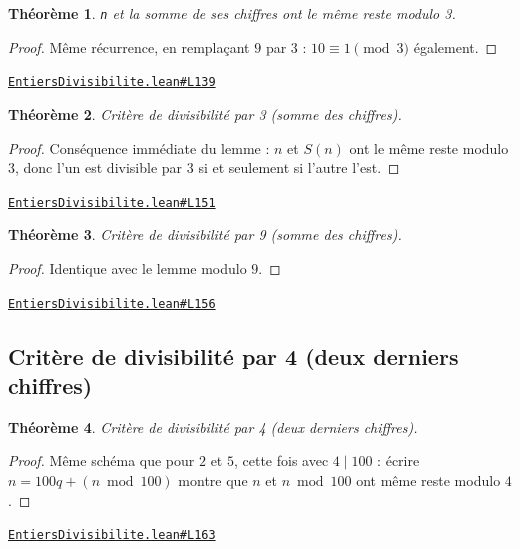 \documentclass[11pt,a4paper]{article}
\theoremstyle{definition}
\theoremstyle{plain}
\newtheorem{theoreme}{Théorème}
\newcommand{\source}[2]{\par\smallskip\noindent\hfill{\footnotesize\href{#1}{\texttt{#2}}}\par\smallskip}
\begin{document}
\begin{theoreme}
\texttt{n} et la somme de ses chiffres ont le même reste modulo 3.
\end{theoreme}

\begin{proof}
Même récurrence, en remplaçant $9$ par $3$ : $10 \equiv 1 \pmod 3$ également.
\end{proof}
\source{https://github.com/Commutator-IO/learn-lean/blob/main/courses/01-college/01-nombres-et-calculs/EntiersDivisibilite.lean\#L139}{EntiersDivisibilite.lean\#L139}

\begin{theoreme}
Critère de divisibilité par 3 (somme des chiffres).
\end{theoreme}

\begin{proof}
Conséquence immédiate du lemme : $n$ et $S(n)$ ont le même reste modulo $3$, donc l'un
est divisible par $3$ si et seulement si l'autre l'est.
\end{proof}
\source{https://github.com/Commutator-IO/learn-lean/blob/main/courses/01-college/01-nombres-et-calculs/EntiersDivisibilite.lean\#L151}{EntiersDivisibilite.lean\#L151}

\begin{theoreme}
Critère de divisibilité par 9 (somme des chiffres).
\end{theoreme}

\begin{proof}
Identique avec le lemme modulo $9$.
\end{proof}
\source{https://github.com/Commutator-IO/learn-lean/blob/main/courses/01-college/01-nombres-et-calculs/EntiersDivisibilite.lean\#L156}{EntiersDivisibilite.lean\#L156}

\subsection{Critère de divisibilité par 4 (deux derniers chiffres)}

\begin{theoreme}
Critère de divisibilité par 4 (deux derniers chiffres).
\end{theoreme}

\begin{proof}
Même schéma que pour $2$ et $5$, cette fois avec $4 \mid 100$ : écrire
$n = 100q + (n \bmod 100)$ montre que $n$ et $n \bmod 100$ ont même reste modulo $4$.
\end{proof}
\source{https://github.com/Commutator-IO/learn-lean/blob/main/courses/01-college/01-nombres-et-calculs/EntiersDivisibilite.lean\#L163}{EntiersDivisibilite.lean\#L163}
\end{document}

